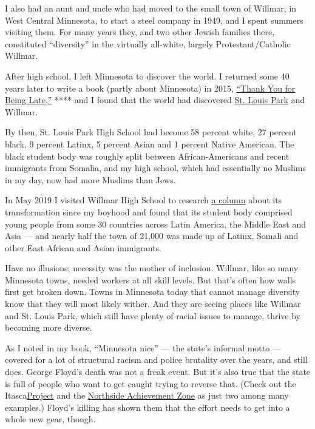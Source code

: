 I also had an aunt and uncle who had moved to the small town of Willmar,
in West Central Minnesota, to start a steel company in 1949, and I spent
summers visiting them. For many years they, and two other Jewish
families there, constituted ``diversity'' in the virtually all-white,
largely Protestant/Catholic Willmar.

After high school, I left Minnesota to discover the world. I returned
some 40 years later to write a book (partly about Minnesota) in 2015,
\href{https://www.thomaslfriedman.com/thank-you-for-being-late/}{``Thank
You for Being Late,''} **** and I found that the world had discovered
\href{https://discoverstlouispark.com/about-st-louis-park/}{St. Louis
Park} and Willmar.

By then, St. Louis Park High School had become 58 percent white, 27
percent black, 9 percent Latinx, 5 percent Asian and 1 percent Native
American. The black student body was roughly split between
African-Americans and recent immigrants from Somalia, and my high
school, which had essentially no Muslims in my day, now had more Muslims
than Jews.

In May 2019 I visited Willmar High School to research
\href{https://www.nytimes3xbfgragh.onion/2019/05/14/opinion/trump-willmar-minnesota.html}{a
column} about its transformation since my boyhood and found that its
student body comprised young people from some 30 countries across Latin
America, the Middle East and Asia --- and nearly half the town of 21,000
was made up of Latinx, Somali and other East African and Asian
immigrants.

Have no illusions; necessity was the mother of inclusion. Willmar, like
so many Minnesota towns, needed workers at all skill levels. But that's
often how walls first get broken down. Towns in Minnesota today that
cannot manage diversity know that they will most likely wither. And they
are seeing places like Willmar and St. Louis Park, which still have
plenty of racial issues to manage, thrive by becoming more diverse.

As I noted in my book, ``Minnesota nice'' --- the state's informal motto
--- covered for a lot of structural racism and police brutality over the
years, and still does. George Floyd's death was not a freak event. But
it's also true that the state is full of people who want to get caught
trying to reverse that. (Check out the
Itasca\href{https://www.theitascaproject.com/}{Project} and the
\href{https://northsideachievement.org/}{Northside Achievement Zone} as
just two among many examples.) Floyd's killing has shown them that the
effort needs to get into a whole new gear, though.

